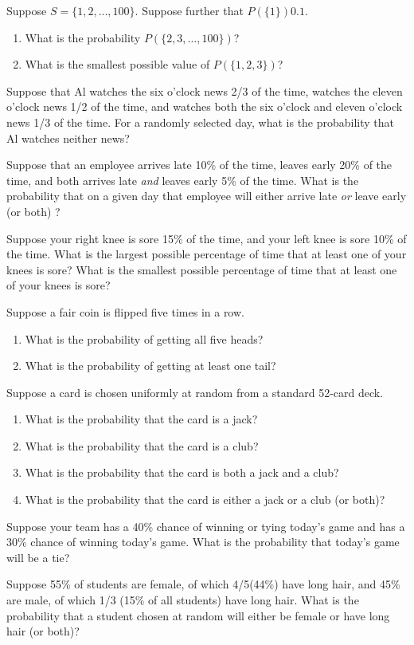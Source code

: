 \begin{exercises}
    \item Suppose $S=\{1,2,\ldots,100\}$. Suppose further that $P(\{1\})0.1$.
    \begin{enumerate}
        \item What is the probability $P(\{2,3,\ldots,100\})$?
        \item What is the smallest possible value of $P(\{1,2,3\})$?
    \end{enumerate}
    \item Suppose that Al watches the six o'clock news 2/3 of the time, watches the eleven o'clock news 1/2 of the
    time, and watches both the six o'clock and eleven o'clock news 1/3 of the time. For a randomly selected day, what
    is the probability that Al watches neither news?
    \item Suppose that an employee arrives late 10\% of the time, leaves early 20\% of the time, and both arrives
    late \emph{and} leaves early 5\% of the time. What is the probability that on a given day that employee will
    either arrive late \emph{or}  leave early (or both) ?
    \item Suppose your right knee is sore 15\% of the time, and your left knee is sore 10\% of the time. What is the
    largest possible percentage of time that at least one of your knees is sore? What is the smallest possible
    percentage of time that at least one of your knees is sore?
    \item Suppose a fair coin is flipped five times in a row.
    \begin{enumerate}
        \item What is the probability of getting all five heads?
        \item What is the probability of getting at least one tail?
    \end{enumerate}
    \item Suppose a card is chosen uniformly at random from a standard 52-card deck.
    \begin{enumerate}
        \item What is the probability that the card is a jack?
        \item What is the probability that the card is a club?
        \item What is the probability that the card is both a jack and a club?
        \item What is the probability that the card is either a jack or a club (or both)?
    \end{enumerate}
    \item Suppose your team has a 40\% chance of winning or tying today's game and has a 30\% chance of winning
    today's game. What is the probability that today's game will be a tie?
    \item Suppose 55\% of students are female, of which 4/5(44\%) have long hair, and 45\% are male, of which 1/3
    (15\% of all students) have long hair. What is the probability that a student chosen at random will either be
    female or have long hair (or both)?
\end{exercises}

